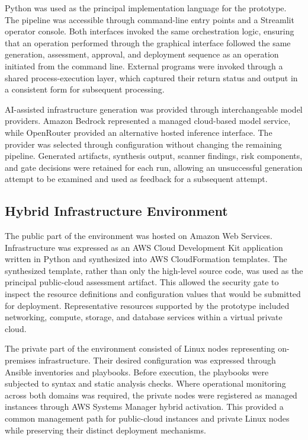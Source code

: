 Python was used as the principal implementation language for the prototype. The
pipeline was accessible through command-line entry points and a Streamlit operator
console. Both interfaces invoked the same orchestration logic, ensuring that an
operation performed through the graphical interface followed the same generation,
assessment, approval, and deployment sequence as an operation initiated from the
command line. External programs were invoked through a shared process-execution layer,
which captured their return status and output in a consistent form for subsequent
processing.

AI-assisted infrastructure generation was provided through interchangeable model
providers. Amazon Bedrock represented a managed cloud-based model service, while
OpenRouter provided an alternative hosted inference interface. The provider was selected
through configuration without changing the remaining pipeline. Generated artifacts,
synthesis output, scanner findings, risk components, and gate decisions were retained
for each run, allowing an unsuccessful generation attempt to be examined and used as
feedback for a subsequent attempt.

\subsection{Hybrid Infrastructure Environment}
\label{subsec:hybrid-infrastructure-environment}

The public part of the environment was hosted on Amazon Web Services. Infrastructure was
expressed as an AWS Cloud Development Kit application written in Python and synthesized
into AWS CloudFormation templates. The synthesized template, rather than only the
high-level source code, was used as the principal public-cloud assessment artifact. This
allowed the security gate to inspect the resource definitions and configuration values
that would be submitted for deployment. Representative resources supported by the
prototype included networking, compute, storage, and database services within a virtual
private cloud.

The private part of the environment consisted of Linux nodes representing on-premises
infrastructure. Their desired configuration was expressed through Ansible inventories
and playbooks. Before execution, the playbooks were subjected to syntax and static
analysis checks. Where operational monitoring across both domains was required, the
private nodes were registered as managed instances through AWS Systems Manager hybrid
activation. This provided a common management path for public-cloud instances and
private Linux nodes while preserving their distinct deployment mechanisms.

